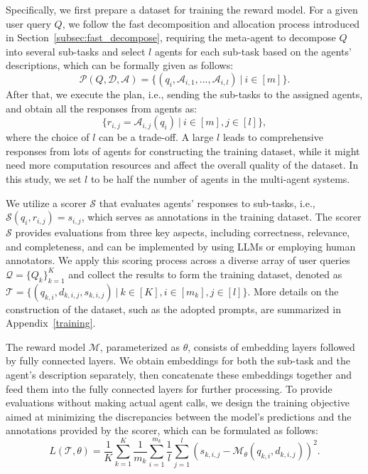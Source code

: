 Specifically, we first prepare a dataset for training the reward model. 
For a given user query $Q$, we follow the fast decomposition and allocation process introduced in Section~\ref{subsec:fast_decompose}, requiring the meta-agent to decompose $Q$ into several sub-tasks and select $l$ agents for each sub-task based on the agents' descriptions, 
which can be formally given as follows:
\begin{equation}
 \mathcal{P}(Q, \mathcal{D}, \mathcal{A})=\{(q_i, \mathcal{A}_{i,1},...,\mathcal{A}_{i,l})\ |\ i\in[m]\}.
\end{equation} 
After that, we execute the plan, i.e., sending the sub-tasks to the assigned agents, and obtain all the responses from agents as:
\begin{equation}
\{r_{i,j}=\mathcal{A}_{i,j}(q_i)\ |\ i\in[m], j\in[l]\},
\end{equation}
where the choice of $l$ can be a trade-off. A large $l$ leads to comprehensive responses from lots of agents for constructing the training dataset, while it might need more computation resources and affect the overall quality of the dataset. In this study, we set $l$ to be half the number of agents in the multi-agent systems.

We utilize a scorer $\mathcal{S}$ that evaluates agents' responses to sub-tasks, i.e., $\mathcal{S}(q_i,r_{i,j})=s_{i,j}$, which serves as annotations in the training dataset.
The scorer $\mathcal{S}$ provides evaluations from three key aspects, including correctness, relevance, and completeness, and can be implemented by using LLMs or employing human annotators.
We apply this scoring process across a diverse array of user queries $\mathcal{Q}=\{Q_k\}_{k=1}^K$ and collect the results to form the training dataset, denoted as $\mathcal{T} = \{(q_{k,i}, d_{k,i,j},s_{k,i,j})\ |\ k\in[K],i\in[m_k],j\in[l]\}$.
More details on the construction of the dataset, such as the adopted prompts, are summarized in Appendix~\ref{training}. 

The reward model $\mathcal{M}$, parameterized as $\theta$, consists of embedding layers followed by fully connected layers. We obtain embeddings for both the sub-task and the agent's description separately, then concatenate these embeddings together and feed them into the fully connected layers for further processing.
To provide evaluations without making actual agent calls, we design the training objective aimed at minimizing the discrepancies between the model's predictions and the annotations provided by the scorer, which can be formulated as follows:
\begin{equation}
    L(\mathcal{T}, \theta)=\frac{1}{K}\sum_{k=1}^K\frac{1}{m_k}\sum_{i=1}^{m_k}\frac{1}{l}\sum_{j=1}^l(s_{k,i,j}-\mathcal{M}_\theta(q_{k,i}, d_{k,i,j}))^2.
\end{equation}

